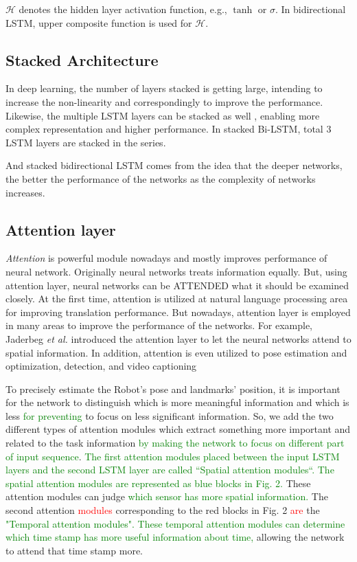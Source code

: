 \documentclass{ieeeaccess}
\begin{document}
$\mathcal{H}$ denotes the hidden layer activation function, e.g., $\tanh$ or $\sigma$. In bidirectional LSTM, upper composite function is used for $\mathcal{H}$.


\subsection{Stacked Architecture}

In deep learning, the number of layers stacked is getting large, intending to increase the non-linearity and correspondingly to improve the performance. Likewise, the multiple LSTM layers can be stacked as well \cite{dyer2015transition}, enabling more complex representation and higher performance. In stacked Bi-LSTM, total 3 LSTM layers are stacked in the series. 


And stacked bidirectional LSTM comes from the idea that the deeper networks, the better the performance of the networks as the complexity of networks increases. 


\subsection{Attention layer}

\textit{Attention} is powerful module nowadays and mostly improves performance of neural network. Originally neural networks treats information equally. But, using attention layer, neural networks can be ATTENDED what it should be examined closely. At the first time, attention is utilized at natural language processing area for improving translation performance\cite{luong2015effective}. But nowadays, attention layer is employed in many areas to improve the performance of the networks. For example, Jaderbeg \textit{et al.}\cite{jaderberg2015spatial} introduced the attention layer to let the neural networks attend to spatial information. In addition, attention is even utilized to pose estimation and optimization\cite{parisotto2018global}, detection\cite{zhu2018towards}, and video captioning\cite{xu2017learning} 

To precisely estimate the Robot’s pose and landmarks’ position, it is important for the network to distinguish which is more meaningful information and which is less \textcolor{green}{for preventing} to focus on less significant information. So, we add the two different types of attention modules \cite{luong2015effective} which extract something more important and related to the task information \textcolor{green}{by making the network to focus on different part of input sequence}. \textcolor{green}{The first attention modules placed between the input LSTM layers and the second LSTM layer are called “Spatial attention modules“. The spatial attention modules are represented as blue blocks in Fig. 2.} These attention modules can judge \textcolor{green}{which sensor has more spatial information.} The second attention \textcolor{red}{modules} corresponding to the red blocks in Fig. 2 \textcolor{red}{are} the \textcolor{green}{"Temporal attention modules". These temporal attention modules can determine which time stamp has more useful information about time,} allowing the network to attend that time stamp more.  
\end{document}
